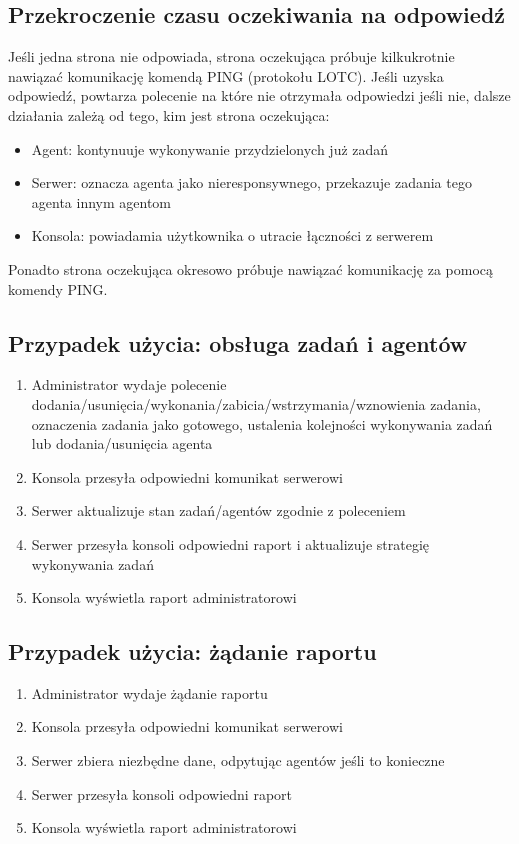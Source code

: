 \documentclass[10pt,a4paper]{article}
\begin{document}
		\subsection{Przekroczenie czasu oczekiwania na odpowiedź}
            Jeśli jedna strona nie odpowiada, strona oczekująca próbuje kilkukrotnie nawiązać komunikację komendą PING (protokołu LOTC). Jeśli uzyska odpowiedź, powtarza polecenie na które nie otrzymała odpowiedzi jeśli nie, dalsze działania zależą od tego, kim jest strona oczekująca:
            \begin{itemize}
	            \item Agent: kontynuuje wykonywanie przydzielonych już zadań
	            \item Serwer: oznacza agenta jako nieresponsywnego, przekazuje zadania tego agenta innym agentom
	            \item Konsola: powiadamia użytkownika o utracie łączności z serwerem
            \end{itemize}
            Ponadto strona oczekująca okresowo próbuje nawiązać komunikację za pomocą komendy PING.
            
        \subsection{Przypadek użycia: obsługa zadań i agentów}
            \begin{enumerate}
	            \item Administrator wydaje polecenie dodania/usunięcia/wykonania/zabicia/wstrzymania/wznowienia zadania, oznaczenia zadania jako gotowego, ustalenia kolejności wykonywania zadań lub dodania/usunięcia agenta
	            \item Konsola przesyła odpowiedni komunikat serwerowi
	            \item Serwer aktualizuje stan zadań/agentów zgodnie z poleceniem
	            \item Serwer przesyła konsoli odpowiedni raport i aktualizuje strategię wykonywania zadań
	            \item Konsola wyświetla raport administratorowi
            \end{enumerate}
        
        \subsection{Przypadek użycia: żądanie raportu}
            \begin{enumerate}
	            \item Administrator wydaje żądanie raportu
	            \item Konsola przesyła odpowiedni komunikat serwerowi
	            \item Serwer zbiera niezbędne dane, odpytując agentów jeśli to konieczne
	            \item Serwer przesyła konsoli odpowiedni raport
	            \item Konsola wyświetla raport administratorowi
            \end{enumerate}
    
\end{document}
